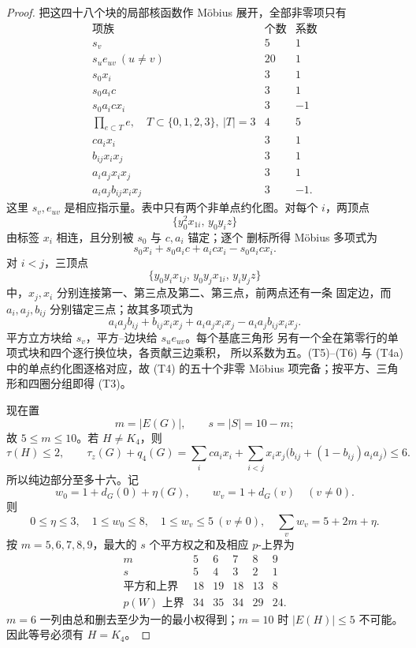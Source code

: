 \begin{proof}
把这四十八个块的局部核函数作 Möbius 展开，全部非零项只有
\[
\begin{array}{c|c|c}
\text{项族}&\text{个数}&\text{系数}\\ \hline
s_v&5&1\\
s_ue_{uv}\ (u\ne v)&20&1\\
s_0x_i&3&1\\
s_0a_ic&3&1\\
s_0a_icx_i&3&-1\\
\prod_{e\subset T}e,\quad T\subset\{0,1,2,3\},\ |T|=3&4&5\\
ca_ix_i&3&1\\
b_{ij}x_ix_j&3&1\\
a_ia_jx_ix_j&3&1\\
a_ia_jb_{ij}x_ix_j&3&-1.
\end{array}                                                     \tag{T4}
\]
这里 \(s_v,e_{uv}\) 是相应指示量。表中只有两个非单点约化图。对每个
\(i\)，两顶点
\[
 \{y_0^2x_{1i},\,y_0y_i z\}
\]
由标签 \(x_i\) 相连，且分别被 \(s_0\) 与 \(c,a_i\) 锚定；逐个
删标所得 Möbius 多项式为
\[
 s_0x_i+s_0a_ic+a_icx_i-s_0a_icx_i.                \tag{T5}
\]
对 \(i<j\)，三顶点
\[
 \{y_0y_ix_{1j},\,y_0y_jx_{1i},\,y_iy_jz\}
\]
中，\(x_j,x_i\) 分别连接第一、第三点及第二、第三点，前两点还有一条
固定边，而 \(a_i,a_j,b_{ij}\) 分别锚定三点；故其多项式为
\[
 a_ia_jb_{ij}+b_{ij}x_ix_j+a_ia_jx_ix_j
 -a_ia_jb_{ij}x_ix_j.                              \tag{T6}
\]
平方立方块给 \(s_v\)，平方--边块给 \(s_ue_{uv}\)。每个基底三角形
另有一个全在第零行的单项式块和四个逐行换位块，各贡献三边乘积，
所以系数为五。(T5)--(T6) 与 (T4a) 中的单点约化图逐格对应，故
(T4) 的五十个非零 Möbius 项完备；按平方、三角形和四圈分组即得
(T3)。

现在置
\[
 m=|E(G)|,\qquad s=|S|=10-m;
\]
故 \(5\le m\le10\)。若 \(H\ne K_4\)，则
\[
 \tau(H)\le2,\qquad
 \tau_z(G)+q_4(G)
 =\sum_i ca_ix_i+
 \sum_{i<j}x_ix_j\bigl(b_{ij}+(1-b_{ij})a_ia_j\bigr)\le6.
                                                               \tag{T7}
\]
所以纯边部分至多十六。记
\[
 w_0=1+d_G(0)+\eta(G),\qquad w_v=1+d_G(v)\quad(v\ne0).
\]
则
\[
0\le\eta\le3,\quad 1\le w_0\le8,\quad
1\le w_v\le5\ (v\ne0),\quad
\sum_vw_v=5+2m+\eta.                                  \tag{T8}
\]
按 \(m=5,6,7,8,9\)，最大的 \(s\) 个平方权之和及相应 \(p\)-上界为
\[
\begin{array}{c|rrrrr}
m&5&6&7&8&9\\ \hline
s&5&4&3&2&1\\
\text{平方和上界}&18&19&18&13&8\\
p(W)\text{ 上界}&34&35&34&29&24.
\end{array}                                                     \tag{T9}
\]
\(m=6\) 一列由总和删去至少为一的最小权得到；\(m=10\) 时
\(|E(H)|\le5\) 不可能。因此等号必须有 \(H=K_4\)。


\end{proof}

